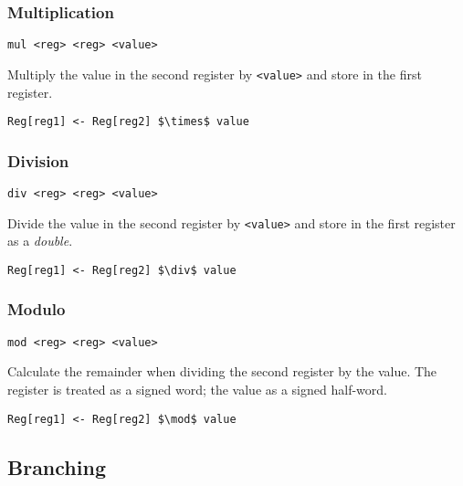 \subsubsection{Multiplication}

\begin{lstlisting}[style=assembly]
    mul <reg> <reg> <value>
\end{lstlisting}

Multiply the value in the second register by \texttt{<value>} and store in the first register.

\begin{lstlisting}[style=rtn,mathescape]
    Reg[reg1] <- Reg[reg2] $\times$ value
\end{lstlisting}

\subsubsection{Division}

\begin{lstlisting}[style=assembly]
    div <reg> <reg> <value>
\end{lstlisting}

Divide the value in the second register by \texttt{<value>} and store in the first register as a \textit{double}.

\begin{lstlisting}[style=rtn,mathescape]
    Reg[reg1] <- Reg[reg2] $\div$ value
\end{lstlisting}

\subsubsection{Modulo}

\begin{lstlisting}[style=assembly]
    mod <reg> <reg> <value>
\end{lstlisting}

Calculate the remainder when dividing the second register by the value.
The register is treated as a signed word; the value as a signed half-word.

\begin{lstlisting}[style=rtn,mathescape]
    Reg[reg1] <- Reg[reg2] $\mod$ value
\end{lstlisting}

\subsection{Branching}

